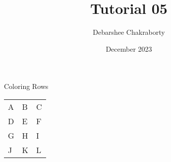 \documentclass{article}
\title{Tutorial 05}
\author{Debarshee Chakraborty}
\date{December 2023}
\begin{document}
\maketitle

Coloring Rows

\begin{tabular}{|l|l|l|}
    \rowcolor{green}
    A & B & C \\
    \rowcolor{red}
    D & E & F \\
    G & H & I \\
    \rowcolor{blue}
    J & K & L
\end{tabular}
\end{document}
